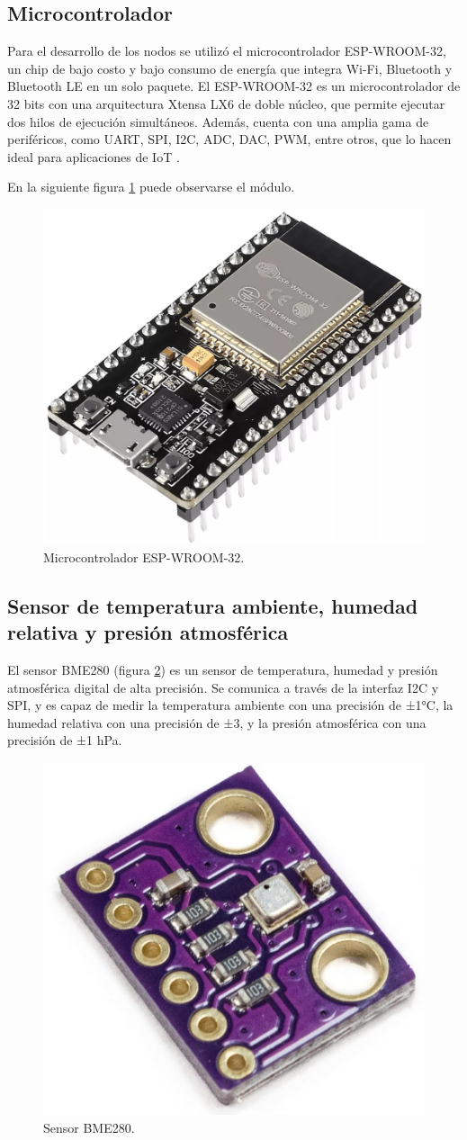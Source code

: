 \subsection{Microcontrolador}\label{sec:microcontrolador}

Para el desarrollo de los nodos se utilizó el microcontrolador ESP-WROOM-32, un
chip de bajo costo y bajo consumo de energía que integra Wi-Fi, Bluetooth y
Bluetooth LE en un solo paquete. El ESP-WROOM-32 es un microcontrolador de 32
bits con una arquitectura Xtensa LX6 de doble núcleo, que permite ejecutar dos
hilos de ejecución simultáneos. Además, cuenta con una amplia gama de
periféricos, como UART, SPI, I2C, ADC, DAC, PWM, entre otros, que lo hacen
ideal para aplicaciones de IoT \cite{EspressifESP32WROOM}.

En la siguiente figura \ref{fig:ESP32} puede observarse el módulo.

\begin{figure}[H]
	\centering
	\includegraphics[width=.30\textwidth]{./Images/3.png}
	\caption{Microcontrolador ESP-WROOM-32.}
	\label{fig:ESP32}
\end{figure}

\subsection{Sensor de temperatura ambiente, humedad relativa y presión atmosférica}

El sensor BME280 (figura \ref{fig:BME280}) es un sensor de temperatura, humedad
y presión atmosférica digital de alta precisión. Se comunica a través de la
interfaz I2C y SPI, y es capaz de medir la temperatura ambiente con una
precisión de ±1°C, la humedad relativa con una precisión de ±3\code{\%}, y la
presión atmosférica con una precisión de ±1 hPa\cite{BoschBME280}.

\begin{figure}[H]
	\centering
	\includegraphics[width=.15\textwidth]{./Images/4.png}
	\caption{Sensor BME280.}
	\label{fig:BME280}
\end{figure}

